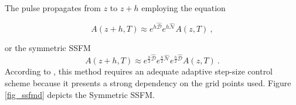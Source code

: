         The pulse propagates from $z$ to $z+h$ employing the equation 
        
        \begin{equation}\label{eq_azh}
            A(z+h, T) \approx e^{h\hat{\mathcal{D}}} e^{h\hat{\mathcal{N}}} A(z,T) \ ,
        \end{equation}
        
        or the symmetric SSFM \citep{sinkin}
        \begin{equation}\label{eq_azh2}
            A(z+h, T) \approx e^{\frac{h}{2}\hat{\mathcal{D}}} e^{\frac{h}{2}\hat{\mathcal{N}}} e^{\frac{h}{2}\hat{\mathcal{D}}} A(z,T) \ .
        \end{equation} According to \citep{Balac2013OverviewOA}, this method requires an adequate adaptive step-size control scheme because it presents a strong dependency on the grid points used. Figure \ref{fig_ssfmd} depicts the Symmetric SSFM.
        
        
        
